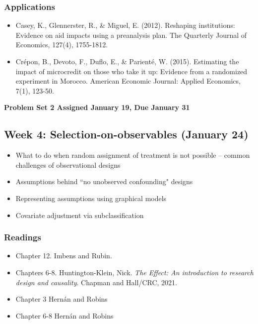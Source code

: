 \documentclass[11pt, article, oneside]{memoir}
\theoremstyle{Assumption}
\begin{document}
\subsubsection*{Applications}

\begin{itemize}
\item Casey, K., Glennerster, R., \& Miguel, E. (2012). Reshaping institutions: Evidence on aid impacts using a preanalysis plan. The Quarterly Journal of Economics, 127(4), 1755-1812.
\item Crépon, B., Devoto, F., Duflo, E., \& Parienté, W. (2015). Estimating the impact of microcredit on those who take it up: Evidence from a randomized experiment in Morocco. American Economic Journal: Applied Economics, 7(1), 123-50.
\end{itemize}


\textbf{Problem Set 2 Assigned January 19, Due January 31}

\subsection{Week 4: Selection-on-observables (January 24)}

\begin{itemize}
\item What to do when random assignment of treatment is not possible -- common challenges of observational designs
\item Assumptions behind ``no unobserved confounding" designs
\item Representing assumptions using graphical models
\item Covariate adjustment via subclassification
\end{itemize}

\subsubsection*{Readings}

\begin{itemize}
\item Chapter 12. Imbens and Rubin.
\item Chapters 6-8. Huntington-Klein, Nick. \emph{The Effect: An introduction to research design and causality}. Chapman and Hall/CRC, 2021.
\item Chapter 3 Hern\'an and  Robins
\item Chapter 6-8 Hern\'an and  Robins
\end{itemize}
\end{document}
